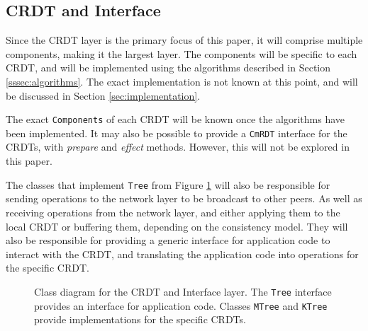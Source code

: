 \documentclass[12pt]{report}
\begin{document}
\subsection{CRDT and Interface}
Since the CRDT layer is the primary focus of this paper, it will comprise multiple components, making it the largest layer. The components will be specific to each CRDT, and will be implemented using the algorithms described in Section \ref{sssec:algorithms}. The exact implementation is not known at this point, and will be discussed in Section \ref{sec:implementation}. \par


The exact \texttt{Components} of each CRDT will be known once the algorithms have been implemented. It may also be possible to provide a \texttt{CmRDT} interface for the CRDTs, with \textit{prepare} and \textit{effect} methods. However, this will not be explored in this paper. \par

The classes that implement \texttt{Tree} from Figure \ref{fig:crdt} will also be responsible for sending operations to the network layer to be broadcast to other peers. As well as receiving operations from the network layer, and either applying them to the local CRDT or buffering them, depending on the consistency model. They will also be responsible for providing a generic interface for application code to interact with the CRDT, and translating the application code into operations for the specific CRDT. \par

\begin{figure}[H]
    \centering
    \caption{Class diagram for the CRDT and Interface layer. The \texttt{Tree} interface provides an interface for application code. Classes \texttt{MTree} and \texttt{KTree} provide implementations for the specific CRDTs.}
    \label{fig:crdt}
\end{figure}
\end{document}
